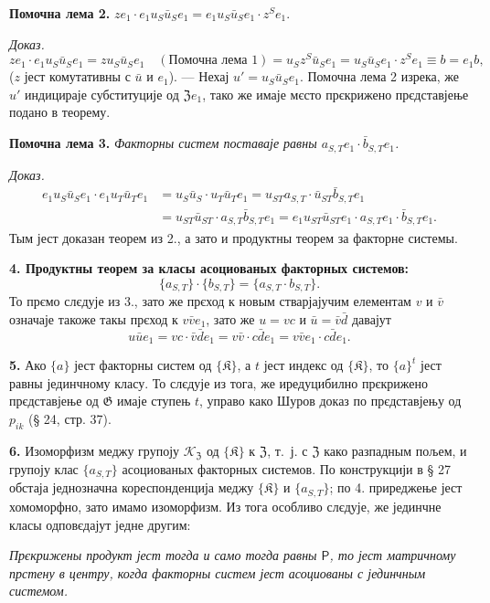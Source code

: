 \documentclass[11pt]{article}
\begin{document}
\noindent\textbf{Помочна лема 2.} \(ze_1\cdot e_1u_S\bar u_Se_1=e_1u_S\bar u_Se_1\cdot z^Se_1\).

\noindent\emph{Доказ.} 
\[
ze_1\cdot e_1u_S\bar u_Se_1
=zu_S\bar u_Se_1\quad(\text{Помочна лема 1})
=u_Sz^S\bar u_Se_1
=u_S\bar u_Se_1\cdot z^Se_1
\equiv b=e_1b,
\]
(\(z\) јест комутативны с \(\bar u\) и \(e_1\)). --- Нехај \(u'=u_S\bar u_Se_1\). Помочна лема 2 изрека, же \(u'\) индицираје субституције од \(\mathfrak Ze_1\), тако же имаје мєсто прєкрижено прєдставјење подано в теорему.

\noindent\textbf{Помочна лема 3.} \emph{Факторны систем поставаје равны \(a_{S,T}e_1\cdot\bar b_{S,T}e_1\).}

\noindent\emph{Доказ.}
\[
\begin{aligned}
e_1u_S\bar u_Se_1\cdot e_1u_T\bar u_Te_1
&=u_S\bar u_S\cdot u_T\bar u_Te_1
 =u_{ST}a_{S,T}\cdot\bar u_{ST}\bar b_{S,T}e_1\\
&=u_{ST}\bar u_{ST}\cdot a_{S,T}\bar b_{S,T}e_1
 =e_1u_{ST}\bar u_{ST}e_1\cdot a_{S,T}e_1\cdot\bar b_{S,T}e_1.
\end{aligned}
\]
Тым јест доказан теорем из 2., а зато и продуктны теорем за факторне системы.

\noindent\textbf{4. Продуктны теорем за класы асоциованых факторных системов:}
\[
\{a_{S,T}\}\cdot\{b_{S,T}\}=\{a_{S,T}\cdot b_{S,T}\}.
\]
То прємо слєдује из 3., зато же прєход к новым стварјајучим елементам \(v\) и \(\bar v\) означаје такоже такы прєход к \(v\bar ve_1\), зато же \(u=vc\) и \(\bar u=\bar v\bar d\) давајут
\[
u\bar ue_1=vc\cdot\bar v\bar de_1=v\bar v\cdot c\bar de_1=v\bar ve_1\cdot c\bar de_1.
\]

\noindent\textbf{5.} Ако \(\{a\}\) јест факторны систем од \(\{\mathfrak K\}\), а \(t\) јест индекс од \(\{\mathfrak K\}\), то \(\{a\}^t\) јест равны јединчному класу. То слєдује из тога, же иредуцибилно прєкрижено прєдставјење од \(\mathfrak G\) имаје ступењ \(t\), управо како Шуров доказ по прєдставјењу од \(p_{ik}\) (§ 24, стр. 37).

\noindent\textbf{6.} Изоморфизм меджу групоју \(\mathscr K_{\mathfrak Z}\) од \(\{\mathfrak K\}\) к \(\mathfrak Z\), т.~ј. с \(\mathfrak Z\) како разпадным пољем, и групоју клас \(\{a_{S,T}\}\) асоциованых факторных системов. По конструкцији в § 27 обстаја једнозначна кореспонденција меджу \(\{\mathfrak K\}\) и \(\{a_{S,T}\}\); по 4. приреджење јест хомоморфно, зато имамо изоморфизм. Из тога особливо слєдује, же јединчне класы одповєдајут једне другим:

\noindent\emph{Прєкрижены продукт јест тогда и само тогда равны \(\mathsf{P}\), то јест матричному прстену в центру, когда факторны систем јест асоциованы с јединчным системом.}
\end{document}

